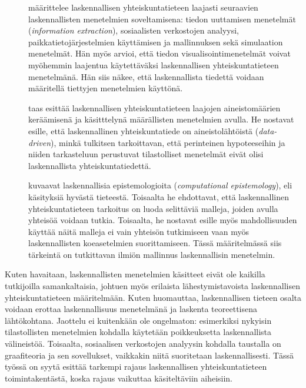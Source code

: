 \documentclass[finnish,gradu,twoside,12pt]{tktltiki}
\begin{document}
\begin{description}
\item[\citet{cioffi-revilla10}] määrittelee laskennallisen yhteiskuntatieteen laajasti seuraavien laskennallisten menetelmien soveltamisena: tiedon uuttamisen menetelmät (\textit{information extraction}), sosiaalisten verkostojen analyysi, paikkatietojärjestelmien käyttämisen ja mallinnuksen sekä simulaation menetelmät. Hän myös arvioi, että tiedon visualisointimenetelmät voivat myöhemmin laajentua käytettäväksi laskennallisen yhteiskuntatieteen menetelmänä. Hän siis näkee, että laskennallista tiedettä voidaan määritellä tiettyjen menetelmien käyttönä.
\item[\citet{lazer09}] taas esittää laskennallisen yhteiskuntatieteen laajojen aineistomäärien keräämisenä ja käsitttelynä määrällisten menetelmien avulla. He nostavat esille, että laskennallinen yhteiskuntatiede on aineistolähtöistä (\textit{data-driven}), minkä tulkitsen tarkoittavan, että perinteinen hypoteeseihin ja niiden tarkasteluun perustuvat tilastolliset menetelmät eivät olisi laskennallista yhteiskuntatiedettä.
\item[\cite{bankes02}] kuvaavat laskennallisia epistemologioita (\textit{computational epistemology}), eli käsityksiä hyvästä tieteestä. Toisaalta he ehdottavat, että laskennallinen yhteiskuntatieteen tarkoitus on luoda selittäviä malleja, joiden avulla yhteisöä voidaan tutkia. Toisaalta, he nostavat esille myös mahdollisuuden käyttää näitä malleja ei vain yhteisön tutkimiseen vaan myös laskennallisten koeasetelmien suorittamiseen. Tässä määritelmässä siis tärkeintä on tutkittavan ilmiön mallinnus laskennallisin menetelmin.
\end{description}

Kuten havaitaan, laskennallisten menetelmien käsitteet eivät ole kaikilla tutkijoilla samankaltaisia, johtuen myös erilaista lähestymistavoista laskennallisen yhteiskuntatieteen määritelmään. Kuten \citet{cioffi-revilla10} huomauttaa, laskennallisen tieteen osalta voidaan erottaa laskennallisuus menetelmänä ja laskenta teoreettisena lähtökohtana. Jaottelu ei kuitenkään ole ongelmaton: esimerkiksi nykyisin tilastollisten menetelmien kohdalla käytetään poikkeuksetta laskennallista välineistöä. Toisaalta, sosiaalisen verkostojen analyysin kohdalla taustalla on graafiteoria ja sen sovellukset, vaikkakin niitä suoritetaan laskennallisesti. Tässä työssä on syytä esittää tarkempi rajaus laskennallisen yhteiskuntatieteen toimintakentästä, koska rajaus vaikuttaa käsiteltäviin aiheisiin.
\end{document}
